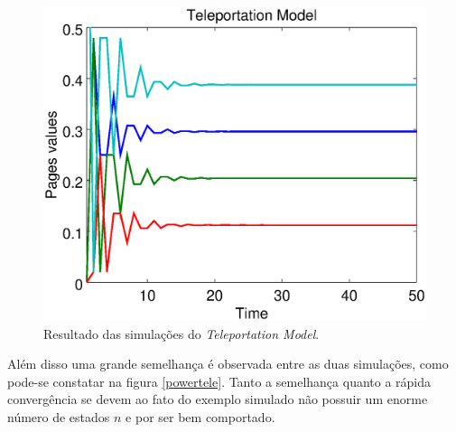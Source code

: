 \documentclass[a4paper]{report} %
\begin{document}
\
\begin{figure}[!htb]
	\centering
	\includegraphics[scale=0.3]{imagens/teleportation}
	\caption{Resultado das simulações do \textit{Teleportation Model}.}
	\label{teleportation}
\end{figure}

Além disso uma grande semelhança é observada entre as duas simulações, como pode-se constatar na figura \ref{powertele}. Tanto a semelhança quanto a rápida convergência se devem ao fato do exemplo simulado não possuir um enorme número de estados $n$ e por ser bem comportado.
\end{document}
